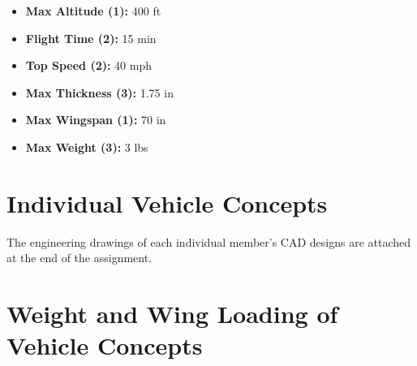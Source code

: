     \begin{itemize}
        \item \textbf{Max Altitude (1):} 400 ft
        \item \textbf{Flight Time (2):} 15 min
        \item \textbf{Top Speed (2):} 40 mph
        \item \textbf{Max Thickness (3):} 1.75 in
        \item \textbf{Max Wingspan (1):} 70 in
        \item \textbf{Max Weight (3):} 3 lbs
    \end{itemize}

\section{Individual Vehicle Concepts}

    The engineering drawings of each individual member's CAD designs are attached at the end of the assignment.

\section{Weight and Wing Loading of Vehicle Concepts}
    
